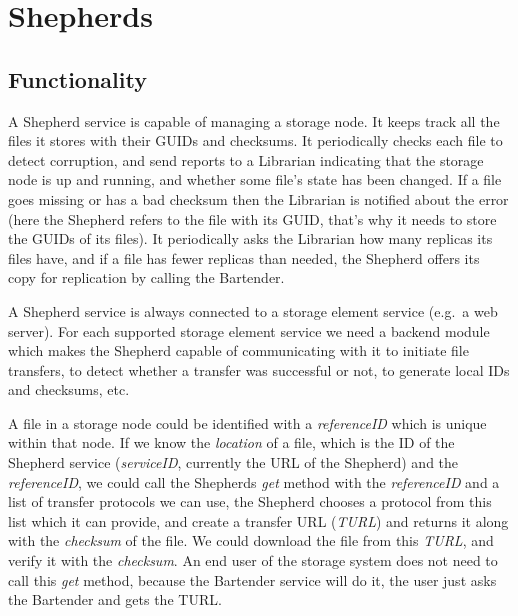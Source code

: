 \documentclass{book}
\begin{document}

\newpage

\section{Shepherds} %
\label{sec:shepherds}

\subsection{Functionality} %

A Shepherd service is capable of managing a storage node. It keeps track all the files it stores with their GUIDs and checksums. It periodically checks each file to detect corruption, and send reports to a Librarian indicating that the storage node is up and running, and whether some file's state has been changed. If a file goes missing or has a bad checksum then the Librarian is notified about the error (here the Shepherd refers to the file with its GUID, that's why it needs to store the GUIDs of its files). It periodically asks the Librarian how many replicas its files have, and if a file has fewer replicas than needed, the Shepherd offers its copy for replication by calling the Bartender.

A Shepherd service is always connected to a storage element service (e.g.~a web server). For each supported storage element service we need a backend module which makes the Shepherd capable of communicating with it to initiate file transfers, to detect whether a transfer was successful or not, to generate local IDs and checksums, etc.

A file in a storage node could be identified with a \emph{referenceID} which is unique within that node. If we know the \emph{location} of a file, which is the ID of the Shepherd service (\emph{serviceID}, currently the URL of the Shepherd) and the \emph{referenceID}, we could call the Shepherds \emph{get} method with the \emph{referenceID} and a list of transfer protocols we can use, the Shepherd chooses a protocol from this list which it can provide, and create a transfer URL (\emph{TURL}) and returns it along with the \emph{checksum} of the file. We could download the file from this \emph{TURL}, and verify it with the \emph{checksum}. An end user of the storage system does not need to call this \emph{get} method, because the Bartender service will do it, the user just asks the Bartender and gets the TURL.
\end{document}
